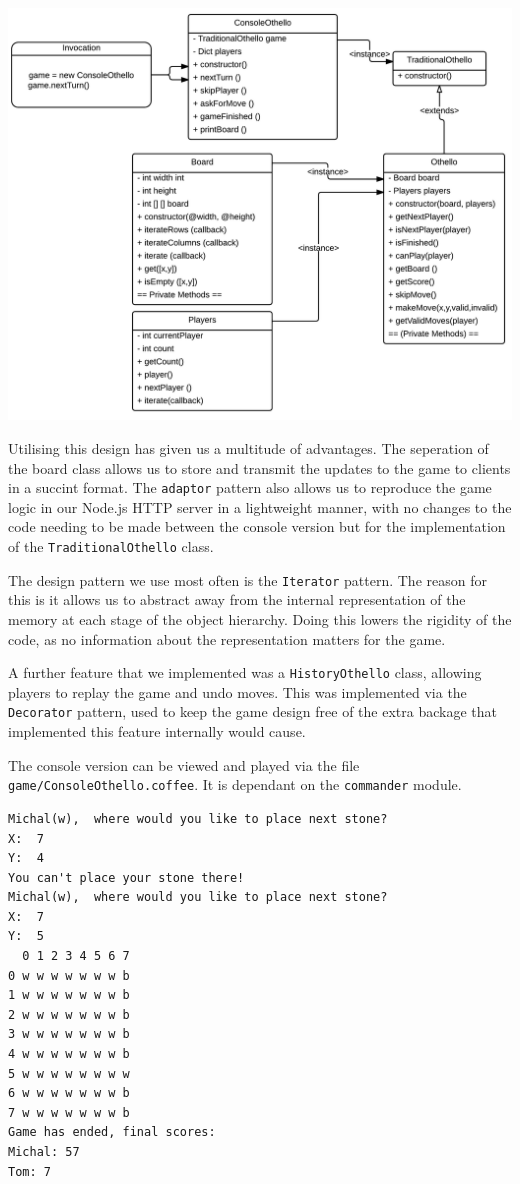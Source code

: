\documentclass[a4wide, 11pt]{article}
\begin{document}
\includegraphics[width=\textwidth]{OthelloGameClassDiagram.png}

Utilising this design has given us a multitude of advantages. The seperation of the board class allows us to store and transmit the updates to the game to clients in a succint format. The \texttt{adaptor} pattern also allows us to reproduce the game logic in our Node.js HTTP server in a lightweight manner, with no changes to the code needing to be made between the console version but for the implementation of the \texttt{TraditionalOthello} class.

The design pattern we use most often is the \texttt{Iterator} pattern. The reason for this is it allows us to abstract away from the internal representation of the memory at each stage of the object hierarchy. Doing this lowers the rigidity of the code, as no information about the representation matters for the game.

A further feature that we implemented was a \texttt{HistoryOthello} class, allowing players to replay the game and undo moves. This was implemented via the \texttt{Decorator} pattern, used to keep the game design free of the extra backage that implemented this feature internally would cause.

The console version can be viewed and played via the file \texttt{game/ConsoleOthello.coffee}. It is dependant on the \texttt{commander} module.

\begin{verbatim}
Michal(w),  where would you like to place next stone?
X:  7
Y:  4
You can't place your stone there!
Michal(w),  where would you like to place next stone?
X:  7
Y:  5
  0 1 2 3 4 5 6 7
0 w w w w w w w b
1 w w w w w w w b
2 w w w w w w w b
3 w w w w w w w b
4 w w w w w w w b
5 w w w w w w w w
6 w w w w w w w b
7 w w w w w w w b
Game has ended, final scores:
Michal: 57
Tom: 7
\end{verbatim}
\end{document}
